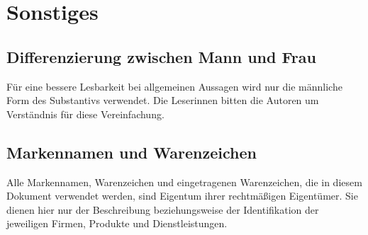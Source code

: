 \section{Sonstiges}
%
%
\subsection*{Differenzierung zwischen Mann und Frau}
Für eine bessere Lesbarkeit bei allgemeinen Aussagen wird nur die männliche Form des Substantivs verwendet. Die Leserinnen bitten die Autoren um Verständnis für diese Vereinfachung.
%
\subsection*{Markennamen und Warenzeichen}
Alle Markennamen, Warenzeichen und eingetragenen Warenzeichen, die in diesem Dokument verwendet werden, sind Eigentum ihrer rechtmäßigen Eigentümer. Sie dienen hier nur der Beschreibung beziehungsweise der Identifikation der jeweiligen Firmen, Produkte und Dienstleistungen.

